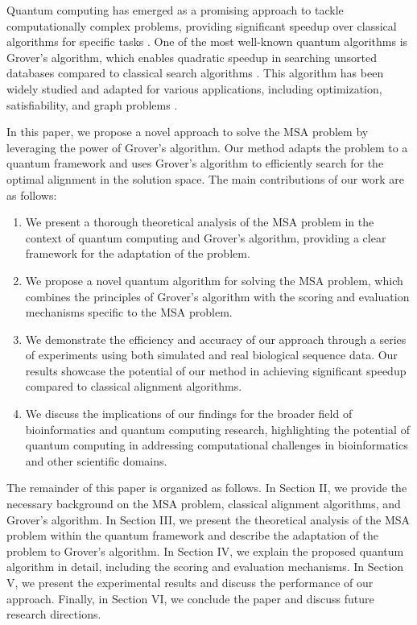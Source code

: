 Quantum computing has emerged as a promising approach to tackle computationally complex problems, providing significant speedup over classical algorithms for specific tasks \cite{shor1999polynomial, grover1996fast}. One of the most well-known quantum algorithms is Grover's algorithm, which enables quadratic speedup in searching unsorted databases compared to classical search algorithms \cite{grover1996fast}. This algorithm has been widely studied and adapted for various applications, including optimization, satisfiability, and graph problems \cite{ambainis2019quantum, durr1996quantum, childs2002quantum}.

In this paper, we propose a novel approach to solve the MSA problem by leveraging the power of Grover's algorithm. Our method adapts the problem to a quantum framework and uses Grover's algorithm to efficiently search for the optimal alignment in the solution space. The main contributions of our work are as follows:

\begin{enumerate}
    \item We present a thorough theoretical analysis of the MSA problem in the context of quantum computing and Grover's algorithm, providing a clear framework for the adaptation of the problem.
    
    \item We propose a novel quantum algorithm for solving the MSA problem, which combines the principles of Grover's algorithm with the scoring and evaluation mechanisms specific to the MSA problem.
    
    \item We demonstrate the efficiency and accuracy of our approach through a series of experiments using both simulated and real biological sequence data. Our results showcase the potential of our method in achieving significant speedup compared to classical alignment algorithms.
    
    \item We discuss the implications of our findings for the broader field of bioinformatics and quantum computing research, highlighting the potential of quantum computing in addressing computational challenges in bioinformatics and other scientific domains.
\end{enumerate}

The remainder of this paper is organized as follows. In Section II, we provide the necessary background on the MSA problem, classical alignment algorithms, and Grover's algorithm. In Section III, we present the theoretical analysis of the MSA problem within the quantum framework and describe the adaptation of the problem to Grover's algorithm. In Section IV, we explain the proposed quantum algorithm in detail, including the scoring and evaluation mechanisms. In Section V, we present the experimental results and discuss the performance of our approach. Finally, in Section VI, we conclude the paper and discuss future research directions.

